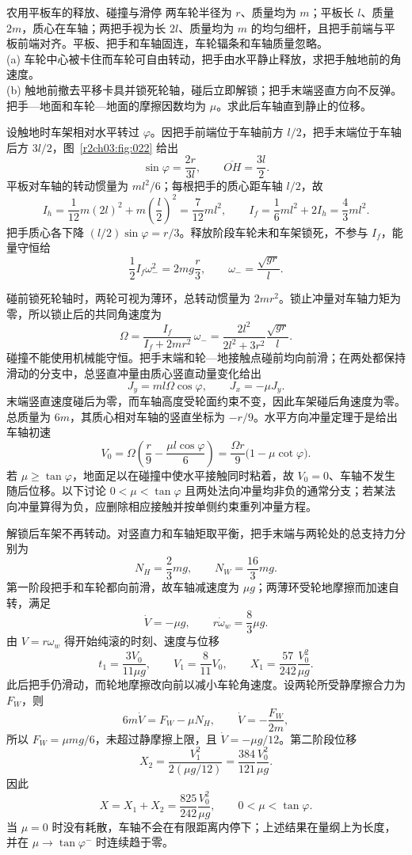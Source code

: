 \begin{practicebox}{农用平板车的释放、碰撞与滑停}
两车轮半径为 $r$、质量均为 $m$；平板长 $l$、质量 $2m$，质心在车轴；两把手视为长 $2l$、质量均为 $m$ 的均匀细杆，且把手前端与平板前端对齐。平板、把手和车轴固连，车轮辐条和车轴质量忽略。\\
(a) 车轮中心被卡住而车轮可自由转动，把手由水平静止释放，求把手触地前的角速度。\\
(b) 触地前撤去平移卡具并锁死轮轴，碰后立即解锁；把手末端竖直方向不反弹。把手—地面和车轮—地面的摩擦因数均为 $\mu$。求此后车轴直到静止的位移。
\label{r2ch03:pr:006}
\begin{solution}
设触地时车架相对水平转过 $\varphi$。因把手前端位于车轴前方 $l/2$，把手末端位于车轴后方 $3l/2$，图~\ref{r2ch03:fig:022} 给出
\[
 \sin\varphi=\frac{2r}{3l},\qquad
 \overline{OH}=\frac{3l}{2}.
\]
平板对车轴的转动惯量为 $ml^2/6$；每根把手的质心距车轴 $l/2$，故
\[
 I_h=\frac1{12}m(2l)^2+m\left(\frac l2\right)^2
 =\frac7{12}ml^2,\qquad
 I_f=\frac16ml^2+2I_h=\frac43ml^2.
\]
把手质心各下降 $(l/2)\sin\varphi=r/3$。释放阶段车轮未和车架锁死，不参与 $I_f$，能量守恒给
\[
 \frac12I_f\omega_-^2=2mg\frac r3,\qquad
 \boxed{\omega_-=\frac{\sqrt{gr}}{l}}.
\]

碰前锁死轮轴时，两轮可视为薄环，总转动惯量为 $2mr^2$。锁止冲量对车轴力矩为零，所以锁止后的共同角速度为
\[
 \Omega=\frac{I_f}{I_f+2mr^2}\,\omega_-
 =\frac{2l^2}{2l^2+3r^2}\frac{\sqrt{gr}}{l}.
\]
碰撞不能使用机械能守恒。把手末端和轮—地接触点碰前均向前滑；在两处都保持滑动的分支中，总竖直冲量由质心竖直动量变化给出
\[
 J_y=ml\Omega\cos\varphi,\qquad J_x=-\mu J_y.
\]
末端竖直速度碰后为零，而车轴高度受轮面约束不变，因此车架碰后角速度为零。总质量为 $6m$，其质心相对车轴的竖直坐标为 $-r/9$。水平方向冲量定理于是给出车轴初速
\[
 \boxed{V_0=\Omega\left(\frac r9-\frac{\mu l\cos\varphi}{6}\right)
 =\frac{\Omega r}{9}\bigl(1-\mu\cot\varphi\bigr)}.
\]
若 $\mu\ge\tan\varphi$，地面足以在碰撞中使水平接触同时粘着，故 $V_0=0$、车轴不发生随后位移。以下讨论 $0<\mu<\tan\varphi$ 且两处法向冲量均非负的通常分支；若某法向冲量算得为负，应删除相应接触并按单侧约束重列冲量方程。

解锁后车架不再转动。对竖直力和车轴矩取平衡，把手末端与两轮处的总支持力分别为
\[
 N_H=\frac23mg,\qquad N_W=\frac{16}{3}mg.
\]
第一阶段把手和车轮都向前滑，故车轴减速度为 $\mu g$；两薄环受轮地摩擦而加速自转，满足
\[
 \dot V=-\mu g,\qquad r\dot\omega_w=\frac83\mu g.
\]
由 $V=r\omega_w$ 得开始纯滚的时刻、速度与位移
\[
 t_1=\frac{3V_0}{11\mu g},\qquad
 V_1=\frac8{11}V_0,\qquad
 X_1=\frac{57}{242}\frac{V_0^2}{\mu g}.
\]
此后把手仍滑动，而轮地摩擦改向前以减小车轮角速度。设两轮所受静摩擦合力为 $F_W$，则
\[
 6m\dot V=F_W-\mu N_H,\qquad
 \dot V=-\frac{F_W}{2m},
\]
所以 $F_W=\mu mg/6$，未超过静摩擦上限，且 $\dot V=-\mu g/12$。第二阶段位移
\[
 X_2=\frac{V_1^2}{2(\mu g/12)}
 =\frac{384}{121}\frac{V_0^2}{\mu g}.
\]
因此
\[
 \boxed{X=X_1+X_2=\frac{825}{242}\frac{V_0^2}{\mu g}},
 \qquad 0<\mu<\tan\varphi .
\]
当 $\mu=0$ 时没有耗散，车轴不会在有限距离内停下；上述结果在量纲上为长度，并在 $\mu\to\tan\varphi^-$ 时连续趋于零。
\figFarmCart
\end{solution}
\end{practicebox}

